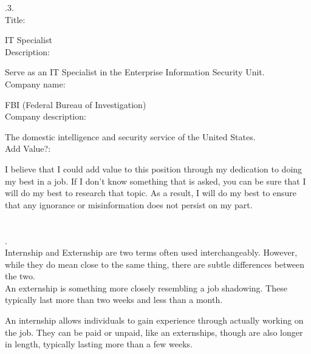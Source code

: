 \documentclass[12pt, a4paper]{article}
\begin{document}
	
.3.\\

Title: 

IT Specialist\\

Description: 

Serve as an IT Specialist in the Enterprise Information Security Unit.\\

Company name: 

FBI (Federal Bureau of Investigation) \\

Company description: 

The domestic intelligence and security service of the United States.\\

Add Value?:

	I believe that I could add value to this position through my dedication to doing my best in a job.  If I don't know something that is asked, you can be sure that I will do my best to research that topic.  As a result, I will do my best to ensure that any ignorance or misinformation does not persist on my part.\\ \\ \\

.\\
 Internship and Externship are two terms often used interchangeably.  However, while they do mean close to the same thing, there are subtle differences between the two.\\
 
 An externship is something more closely resembling a job shadowing.  These typically last more than two weeks and less than a month.    
 
An internship allows individuals to gain experience through actually working on the job.  They can be paid or unpaid, like an externships, though are also longer in length, typically lasting more than a few weeks.
\end{document}
